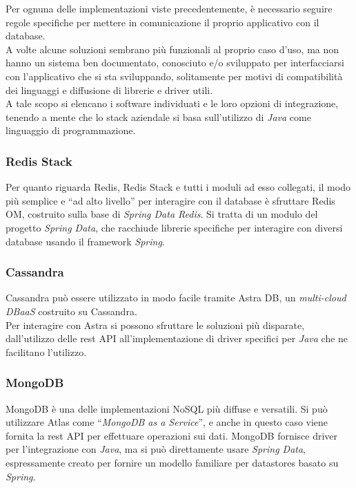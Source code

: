 \noindent Per ognuna delle implementazioni viste precedentemente, è necessario seguire regole specifiche per mettere in comunicazione il proprio applicativo con il database.\\
A volte alcune soluzioni sembrano più funzionali al proprio caso d'uso, ma non hanno un sistema ben documentato, conosciuto e/o sviluppato per interfacciarsi con l'applicativo che si sta sviluppando, solitamente per motivi di compatibilità dei linguaggi e diffusione di librerie e driver utili.\\
A tale scopo si elencano i software individuati e le loro opzioni di integrazione, tenendo a mente che lo stack aziendale si basa sull'utilizzo di \textit{Java} come linguaggio di programmazione.

\subsubsection{Redis Stack}
Per quanto riguarda Redis, Redis Stack e tutti i moduli ad esso collegati, il modo più semplice e ``ad alto livello'' per interagire con il database è sfruttare Redis OM, costruito sulla base di \textit{Spring Data Redis}. Si tratta di un modulo del progetto \textit{Spring Data}, che racchiude librerie specifiche per interagire con diversi database usando il framework \textit{Spring}\cite{site:udemyredis}.

\subsubsection{Cassandra}
Cassandra può essere utilizzato in modo facile tramite Astra DB, un \textit{multi-cloud \gls{DBaaS}} costruito su Cassandra.\\
Per interagire con Astra si possono sfruttare le soluzioni più disparate, dall'utilizzo delle \gls{rest API} all'implementazione di driver specifici per \textit{Java} che ne facilitano l'utilizzo\cite{site:udemycassandra}.

\subsubsection{MongoDB}
MongoDB è una delle implementazioni NoSQL più diffuse e versatili. Si può utilizzare Atlas come ``\textit{MongoDB as a Service}'', e anche in questo caso viene fornita la \gls{rest API} per effettuare operazioni sui dati. MongoDB fornisce driver per l'integrazione con \textit{Java}, ma si può direttamente usare \textit{Spring Data}, espressamente creato per fornire un modello familiare per datastores basato su \textit{Spring}\cite{site:udemymongodb}.

